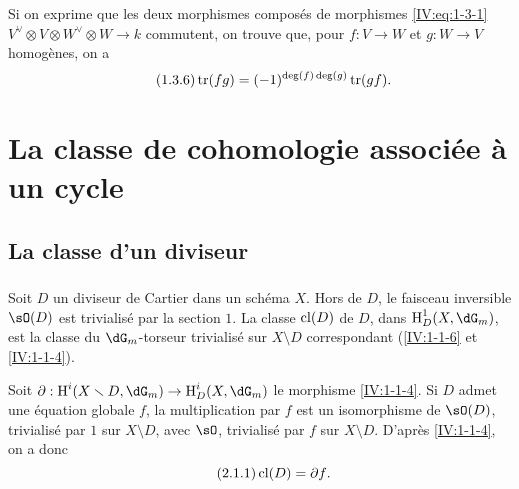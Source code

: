 Si on exprime que les deux morphismes composés de morphismes 
\eqref{IV:eq:1-3-1} $V^\vee\otimes V\otimes W^\vee\otimes W\to k$ commutent, on 
trouve que, pour $f:V\to W$ et $g:W\to V$ homogènes, on a 
\begin{equation*}\tag{1.3.6}\label{IV:eq:1-3-6}
  \operatorname{tr}(f g) = (-1)^{\deg(f)\deg(g)} \operatorname{tr}(g f) \text{.}
\end{equation*}




















\section{La classe de cohomologie associée à un cycle}\label{IV:2}










\subsection{La classe d'un diviseur}\label{IV:2-1}





\subsubsection{}\label{IV:2-1-1}

Soit $D$ un diviseur de Cartier dans un schéma $X$. Hors de $D$, le faisceau 
inversible $\sO(D)$ est trivialisé par la section $1$. La classe 
$\operatorname{cl}(D)$ de $D$, dans $\h_D^1(X,\dG_m)$, est la classe du 
$\dG_m$-torseur trivialisé sur $X\setminus D$ correspondant 
(\ref{IV:1-1-6} et \ref{IV:1-1-4}). 

Soit $\partial:\h^i(X\setminus D,\dG_m)\to \h_D^i(X,\dG_m)$ le morphisme 
\ref{IV:1-1-4}. Si $D$ admet une équation globale $f$, la multiplication par 
$f$ est un isomorphisme de $\sO(D)$, trivialisé par $1$ sur $X\setminus D$, 
avec $\sO$, trivialisé par $f$ sur $X\setminus D$. D'après \ref{IV:1-1-4}, 
on a donc 
\begin{equation*}\tag{2.1.1}\label{IV:eq:2-1-1}
  \operatorname{cl}(D) = \partial f \text{.}
\end{equation*}

